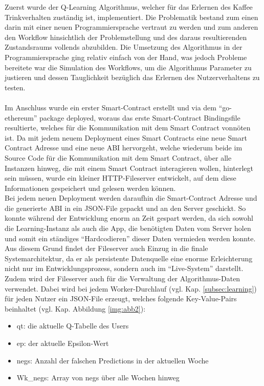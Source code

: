 Zuerst wurde der Q-Learning Algorithmus, welcher für das Erlernen des Kaffee Trinkverhalten zuständig ist, implementiert. Die Problematik bestand zum einen darin mit einer neuen Programmiersprache vertraut zu werden und zum anderen den Workflow hinsichtlich der Problemstellung und des daraus resultierenden Zustandsraums vollends abzubilden. Die Umsetzung des Algorithmus in der Programmiersprache ging relativ einfach von der Hand, was jedoch Probleme bereitete war die Simulation des Workflows, um die Algorithmus Parameter zu justieren und dessen Tauglichkeit bezüglich das Erlernen des Nutzerverhaltens zu testen.\\\\
Im Anschluss wurde ein erster Smart-Contract erstellt und via dem “go-ethereum” package deployed, woraus das erste Smart-Contract Bindingsfile resultierte, welches für die Kommunikation mit dem Smart Contract vonnöten ist. Da mit jedem neuem Deployment eines Smart Contracts eine neue Smart Contract Adresse und eine neue ABI hervorgeht, welche wiederum beide im Source Code für die Kommunikation mit dem Smart Contract, über alle Instanzen hinweg, die mit einem Smart Contract interagieren wollen, hinterlegt sein müssen, wurde ein kleiner HTTP-Fileserver entwickelt, auf dem diese Informationen gespeichert und gelesen werden können. \\
Bei jedem neuen Deployment werden daraufhin die Smart-Contract Adresse und die generierte ABI in ein JSON-File gepackt und an den Server geschickt. So konnte während der Entwicklung enorm an Zeit gespart werden, da sich sowohl die Learning-Instanz als auch die App, die benötigten Daten vom Server holen und somit ein ständiges “Hardcodieren” dieser Daten vermieden werden konnte. \\
Aus diesem Grund findet der Fileserver auch Einzug in die finale Systemarchitektur, da er als persistente Datenquelle eine enorme Erleichterung nicht nur im Entwicklungsprozess, sondern auch im “Live-System” darstellt. \\
Zudem wird der Fileserver auch für die Verwaltung der Algorithmus-Daten verwendet. Dabei wird bei jedem Worker-Durchlauf (vgl. Kap. \ref{subsec:learning}) für jeden Nutzer ein JSON-File erzeugt, welches folgende Key-Value-Pairs beinhaltet (vgl. Kap. Abbildung \ref{img:abb2}):
\begin{itemize}
	\item qt: die aktuelle Q-Tabelle des Users
	\item ep: der aktuelle Epsilon-Wert
	\item negs: Anzahl der falschen Predictions in der aktuellen Woche
	\item Wk\_negs: Array von negs über alle Wochen hinweg
\end{itemize}



